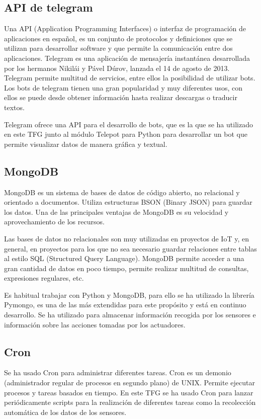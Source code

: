 \documentclass[a4paper, 12pt, oneside]{book}
\begin{document}
\subsection{API de telegram}
\label{subsec:api telegram}

Una API (Application Programming Interfaces) o interfaz de programación de aplicaciones en español, es un conjunto de protocolos y definiciones que se utilizan para desarrollar software y que permite la comunicación entre dos aplicaciones. Telegram es una aplicación de mensajería instantánea desarrollada por los hermanos Nikilái y Pável Dúrov, lanzada el 14 de agosto de 2013. Telegram permite multitud de servicios, entre ellos la posibilidad de utilizar bots. Los bots de telegram tienen una gran popularidad y muy diferentes usos, con ellos se puede desde obtener información hasta realizar descargas o traducir textos.

Telegram ofrece una API para el desarrollo de bots, que es la que se ha utilizado en este TFG junto al módulo Telepot para Python para desarrollar un bot que permite visualizar datos de manera gráfica y textual.

\subsection{MongoDB}
\label{subsec:mongodb}

MongoDB es un sistema de bases de datos de código abierto, no relacional y orientado a documentos. Utiliza estructuras BSON (Binary JSON) para guardar los datos. Una de las principales ventajas de MongoDB es su velocidad y aprovechamiento de los recursos.

Las bases de datos no relacionales son muy utilizadas en proyectos de IoT y, en general, en proyectos para los que no sea necesario guardar relaciones entre tablas al estilo SQL (Structured Query Language). MongoDB permite acceder a una gran cantidad de datos en poco tiempo, permite realizar multitud de consultas, expresiones regulares, etc.

Es habitual trabajar con Python y MongoDB, para ello se ha utilizado la librería Pymongo, es una de las más extendidas para este propósito y está en continuo desarrollo. Se ha utilizado para almacenar información recogida por los sensores e información sobre las acciones tomadas por los actuadores.

\subsection{Cron}
\label{subsec: cron}
Se ha usado Cron para administrar diferentes tareas. Cron es un demonio (administrador regular de procesos en segundo plano) de UNIX. Permite ejecutar procesos y tareas basados en tiempo.
En este TFG se ha usado Cron para lanzar periódicamente scripts para la realización de diferentes tareas como la recolección automática de los datos de los sensores.
 
\end{document}
